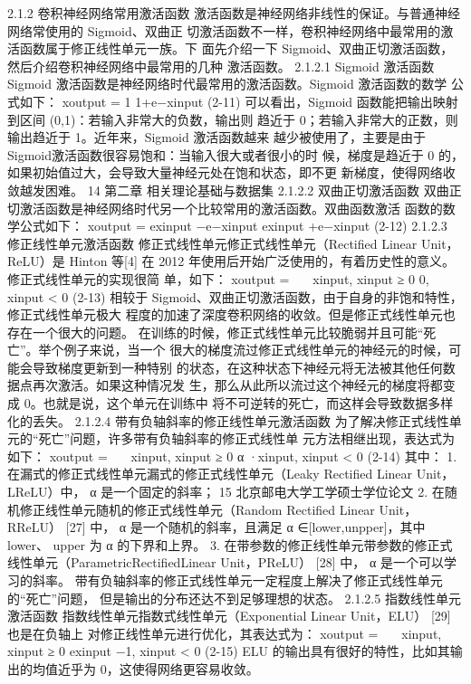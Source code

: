 2.1.2 卷积神经网络常用激活函数 激活函数是神经网络非线性的保证。与普通神经网络常使用的 Sigmoid、双曲正 切激活函数不一样，卷积神经网络中最常用的激活函数属于修正线性单元一族。下 面先介绍一下 Sigmoid、双曲正切激活函数，然后介绍卷积神经网络中最常用的几种 激活函数。
2.1.2.1 Sigmoid 激活函数 Sigmoid 激活函数是神经网络时代最常用的激活函数。Sigmoid 激活函数的数学 公式如下：
xoutput =
1 1+e−xinput
(2-11)
可以看出，Sigmoid 函数能把输出映射到区间 (0,1)：若输入非常大的负数，输出则 趋近于 0；若输入非常大的正数，则输出趋近于 1。近年来，Sigmoid 激活函数越来 越少被使用了，主要是由于Sigmoid激活函数很容易饱和：当输入很大或者很小的时 候，梯度是趋近于 0 的，如果初始值过大，会导致大量神经元处在饱和状态，即不更 新梯度，使得网络收敛越发困难。
14
第二章 相关理论基础与数据集
2.1.2.2 双曲正切激活函数
双曲正切激活函数是神经网络时代另一个比较常用的激活函数。双曲函数激活 函数的数学公式如下：
xoutput =
exinput −e−xinput exinput +e−xinput
(2-12)
2.1.2.3 修正线性单元激活函数 修正式线性单元修正式线性单元（Rectified Linear Unit，ReLU）是 Hinton 等[4] 在 2012 年使用后开始广泛使用的，有着历史性的意义。修正式线性单元的实现很简 单，如下： xoutput =   xinput, xinput ≥ 0 0, xinput < 0 (2-13) 相较于 Sigmoid、双曲正切激活函数，由于自身的非饱和特性，修正式线性单元极大 程度的加速了深度卷积网络的收敛。但是修正式线性单元也存在一个很大的问题。 在训练的时候，修正式线性单元比较脆弱并且可能“死亡”。举个例子来说，当一个 很大的梯度流过修正式线性单元的神经元的时候，可能会导致梯度更新到一种特别 的状态，在这种状态下神经元将无法被其他任何数据点再次激活。如果这种情况发 生，那么从此所以流过这个神经元的梯度将都变成 0。也就是说，这个单元在训练中 将不可逆转的死亡，而这样会导致数据多样化的丢失。
2.1.2.4 带有负轴斜率的修正线性单元激活函数
为了解决修正式线性单元的“死亡”问题，许多带有负轴斜率的修正式线性单 元方法相继出现，表达式为如下： xoutput =   xinput, xinput ≥ 0 α ·xinput, xinput < 0 (2-14) 其中：
1. 在漏式的修正式线性单元漏式的修正式线性单元（Leaky Rectified Linear Unit， LReLU）中， α 是一个固定的斜率；
15
北京邮电大学工学硕士学位论文
2. 在随机修正线性单元随机的修正式线性单元（Random Rectified Linear Unit， RReLU） [27] 中， α 是一个随机的斜率，且满足 α ∈[lower,unpper]，其中 lower、 upper 为 α 的下界和上界。
3. 在带参数的修正线性单元带参数的修正式线性单元（ParametricRectifiedLinear Unit，PReLU） [28] 中， α 是一个可以学习的斜率。
带有负轴斜率的修正式线性单元一定程度上解决了修正式线性单元的“死亡”问题， 但是输出的分布还达不到足够理想的状态。
2.1.2.5 指数线性单元激活函数 指数线性单元指数式线性单元（Exponential Linear Unit，ELU） [29] 也是在负轴上 对修正线性单元进行优化，其表达式为： xoutput =   xinput, xinput ≥ 0 exinput −1, xinput < 0 (2-15) ELU 的输出具有很好的特性，比如其输出的均值近乎为 0，这使得网络更容易收敛。

